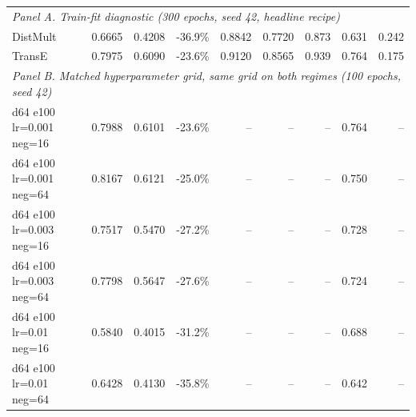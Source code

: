 \begin{table}[H]
\begin{tabular}{lrrrrrrrr}
\midrule
\multicolumn{9}{l}{\textit{Panel A. Train-fit diagnostic (300 epochs, seed 42, headline recipe)}} \\
DistMult & 0.6665 & 0.4208 & -36.9\% & 0.8842 & 0.7720 & 0.873 & 0.631 & 0.242 \\
TransE & 0.7975 & 0.6090 & -23.6\% & 0.9120 & 0.8565 & 0.939 & 0.764 & 0.175 \\
\multicolumn{9}{l}{\textit{Panel B. Matched hyperparameter grid, same grid on both regimes (100 epochs, seed 42)}} \\
d64 e100 lr=0.001 neg=16 & 0.7988 & 0.6101 & -23.6\% & -- & -- & -- & 0.764 & -- \\
d64 e100 lr=0.001 neg=64 & 0.8167 & 0.6121 & -25.0\% & -- & -- & -- & 0.750 & -- \\
d64 e100 lr=0.003 neg=16 & 0.7517 & 0.5470 & -27.2\% & -- & -- & -- & 0.728 & -- \\
d64 e100 lr=0.003 neg=64 & 0.7798 & 0.5647 & -27.6\% & -- & -- & -- & 0.724 & -- \\
d64 e100 lr=0.01 neg=16 & 0.5840 & 0.4015 & -31.2\% & -- & -- & -- & 0.688 & -- \\
d64 e100 lr=0.01 neg=64 & 0.6428 & 0.4130 & -35.8\% & -- & -- & -- & 0.642 & -- \\
\bottomrule
\end{tabular}
\end{table}
